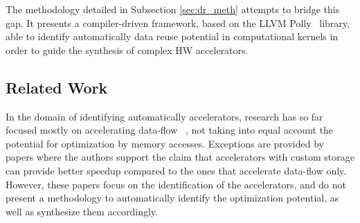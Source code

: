 \documentclass[]{usiinfthesis}
\begin{document}
The methodology detailed in Subsection \ref{sec:dr_meth} attempts to bridge this gap. 
It presents a compiler-driven framework, based on the LLVM Polly~\cite{GrosserApr12} 
library, able to identify automatically data reuse potential in computational kernels in order
to guide the synthesis of complex HW accelerators.
\par
  

\subsection{Related Work}

In the domain of identifying automatically accelerators, research has 
so far focused mostly on accelerating data-flow~\cite{GiaquintaMar15} \cite{GutinFeb12}, 
not taking into equal account the potential for optimization by memory accesses. 
Exceptions are provided by papers \cite{BiswasMar06} \cite{ HaaBOct2014}
where the authors support the claim that accelerators with custom
storage can provide better speedup compared to the ones that
accelerate data-flow only. However, these papers focus on the
identification of the accelerators, and do not present a methodology 
to automatically identify the optimization potential, as well as
synthesize them accordingly.\par
\end{document}
